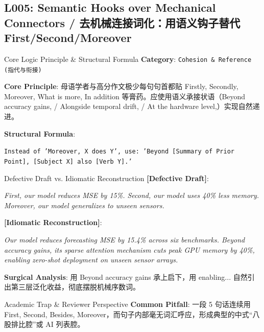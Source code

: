 \subsection{L005: Semantic Hooks over Mechanical Connectors / 去机械连接词化：用语义钩子替代 First/Second/Moreover}\label{sec:logic:L005}
\begin{ConceptBox}{Core Logic Principle \& Structural Formula}
\textbf{Category}: \texttt{Cohesion \& Reference (指代与衔接)}\par\vspace{3pt}
\textbf{Core Principle}: 母语学者与高分作文极少每句句首都贴 Firstly, Secondly, Moreover, What is more, In addition 等膏药。应使用语义承接状语（Beyond accuracy gains, / Alongside temporal drift, / At the hardware level,）实现自然递进。\par\vspace{4pt}
\textbf{Structural Formula}:\par\noindent\texttt{Instead of 'Moreover, X does Y', use: 'Beyond [Summary of Prior Point], [Subject X] also [Verb Y].'}
\end{ConceptBox}
\begin{ExampleBox}{Defective Draft vs. Idiomatic Reconstruction}
\textbf{\color{TargetHighlight}[Defective Draft]}:\par\textit{First, our model reduces MSE by 15\%. Second, our model uses 40\% less memory. Moreover, our model generalizes to unseen sensors.}\par\vspace{4pt}
\textbf{\color{AcadNavy}[Idiomatic Reconstruction]}:\par\textit{Our model reduces forecasting MSE by 15.4\% across six benchmarks. Beyond accuracy gains, its sparse attention mechanism cuts peak GPU memory by 40\%, enabling zero-shot deployment on unseen sensor arrays.}\par\vspace{4pt}
\textbf{Surgical Analysis}: 用 Beyond accuracy gains 承上启下，用 enabling... 自然引出第三层泛化收益，彻底摆脱机械序数词。
\end{ExampleBox}
\begin{TipBox}{Academic Trap \& Reviewer Perspective}
\textbf{Common Pitfall}: 一段 5 句话连续用 First, Second, Besides, Moreover，而句子内部毫无词汇呼应，形成典型的中式“八股排比腔”或 AI 列表腔。
\end{TipBox}
\vspace{6pt}
